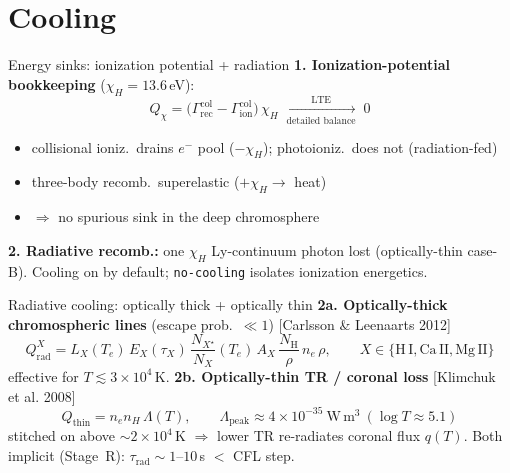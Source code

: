 \documentclass[aspectratio=169]{beamer}
\newcommand{\cit}[1]{{\scriptsize\color{gray}[#1]}}
\begin{document}
\section{Cooling}
\begin{frame}{Energy sinks: ionization potential + radiation}
  \textbf{1. Ionization-potential bookkeeping} ($\chi_H=13.6$\,eV):
  \[
    Q_\chi = \big(\Gamma^\mathrm{col}_\mathrm{rec}-\Gamma^\mathrm{col}_\mathrm{ion}\big)\,\chi_H
    \;\xrightarrow[\text{detailed balance}]{\text{LTE}}\; 0
  \]
  \begin{itemize}\setlength\itemsep{2pt}
    \item collisional ioniz.\ \alert{drains} $e^-$ pool ($-\chi_H$); photoioniz.\ does not (radiation-fed)
    \item three-body recomb.\ \alert{superelastic} ($+\chi_H\to$ heat)
    \item $\Rightarrow$ no spurious sink in the deep chromosphere
  \end{itemize}
  \vfill
  \textbf{2. Radiative recomb.:} one $\chi_H$ Ly-continuum photon lost (optically-thin case-B).
  \vfill
  Cooling \alert{on by default}; \texttt{no-cooling} isolates ionization energetics.
\end{frame}

\begin{frame}{Radiative cooling: optically thick + optically thin}
  \textbf{2a. Optically-thick chromospheric lines} (escape prob.\ $\ll1$)
  \cit{Carlsson \& Leenaarts 2012}
  \[
    Q^X_\mathrm{rad}=L_X(T_e)\,E_X(\tau_X)\,\frac{N_{X^\star}}{N_X}(T_e)\,A_X\,\frac{N_\mathrm H}{\rho}\,n_e\,\rho,
    \qquad X\in\{\mathrm{H\,I,Ca\,II,Mg\,II}\}
  \]
  effective for $T\lesssim3\times10^4$\,K.
  \vfill
  \textbf{2b. Optically-thin TR / coronal loss} \cit{Klimchuk et al. 2008}
  \[
    Q_\mathrm{thin}=n_e n_H\,\Lambda(T),\qquad
    \Lambda_\mathrm{peak}\approx4\times10^{-35}\ \mathrm{W\,m^3}\ (\log T\approx5.1)
  \]
  stitched on above $\sim2\times10^4$\,K $\Rightarrow$ lower TR re-radiates coronal flux $q(T)$.
  \vfill
  Both \alert{implicit} (Stage~R): $\tau_\mathrm{rad}\!\sim\!1$--$10$\,s $<$ CFL step.
\end{frame}

\end{document}
